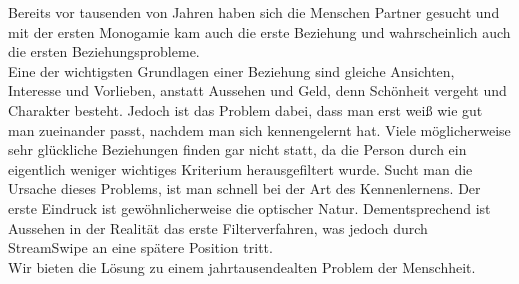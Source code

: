 
Bereits vor tausenden von Jahren haben sich die Menschen Partner gesucht und mit der ersten Monogamie kam auch die erste Beziehung und wahrscheinlich auch die ersten Beziehungsprobleme.\\
Eine der wichtigsten Grundlagen einer Beziehung sind gleiche Ansichten, Interesse und Vorlieben, anstatt Aussehen und Geld, denn Schönheit vergeht und Charakter besteht. Jedoch ist das Problem dabei, dass man erst weiß wie gut man zueinander passt, nachdem man sich kennengelernt hat. Viele möglicherweise sehr glückliche Beziehungen finden gar nicht statt, da die Person durch ein eigentlich weniger wichtiges Kriterium herausgefiltert wurde. Sucht man die Ursache dieses Problems, ist man schnell bei der Art des Kennenlernens. Der erste Eindruck ist gewöhnlicherweise die optischer Natur. Dementsprechend ist Aussehen in der Realität das erste Filterverfahren, was jedoch durch StreamSwipe an eine spätere  Position tritt.\\
Wir bieten die Lösung zu einem jahrtausendealten Problem der Menschheit.

